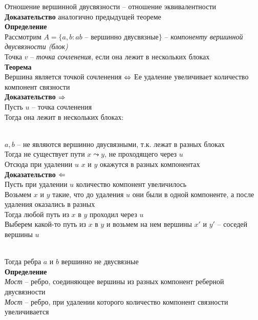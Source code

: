 \documentclass[12pt]{article}
\begin{document}
Отношение вершинной двусвязности -- отношение эквивалентности\\
\textbf{Доказательство} аналогично предыдущей теореме\\
\textbf{Определение}\\
Рассмотрим $A = \{ a, b: ab \text{ -- вершинно двусвязные} \}$ -- \textit{компоненту вершинной двусвязности (блок)}\\
Точка $v$ -- \textit{точка сочленения}, если она лежит в нескольких блоках\\
\textbf{Теорема}\\
Вершина является точкой сочленения $\Leftrightarrow$ Ее удаление увеличивает количество компонент связности\\
\textbf{Доказательство $\Rightarrow$}\\
Пусть $u$ -- точка сочленения\\
Тогда она лежит в нескольких блоках:\\
\\
$a, b$ -- не являются вершинно двусвязными, т.к. лежат в разных блоках\\
Тогда не существует пути $x \leadsto y$, не проходящего через $u$\\
Отсюда при удалении $u$ $x$ и $y$ окажутся в разных компонентах\\
\textbf{Доказательство $\Leftarrow$}\\
Пусть при удалении $u$ количество компонент увеличилось\\
Возьмем $x$ и $y$ такие, что до удаления $u$ они были в одной компоненте, а после удаления оказались в разных\\
Тогда любой путь из $x$ в $y$ проходил через $u$\\
Выберем какой-то путь из $x$ в $y$ и возьмем на нем вершины $x'$ и $y'$ -- соседей вершины $u$\\
\\
Тогда ребра $a$ и $b$ вершинно не двусвязные\\
\textbf{Определение}\\
\textit{Мост} -- ребро, соединяющее вершины из разных компонент реберной двусвязности\\
\textit{Мост} -- ребро, при удалении которого количество компонент связности увеличивается\\
\end{document}
